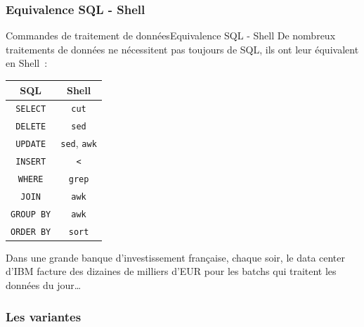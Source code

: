 \documentclass{beamer}
\begin{document}
    \subsubsection{Equivalence SQL - Shell}\label{subsubsec:equi-sql-shell}
    \begin{frame}{Commandes de traitement de données}{Equivalence SQL - Shell}
        De nombreux traitements de données ne nécessitent pas toujours de SQL, ils ont leur équivalent en Shell~:
        \begin{table}[ht]
            \centering
            \begin{tabular}{|c|c|}
                \hline
                \textbf{SQL}         & \textbf{Shell}                   \\
                \hline
                \lstinline{SELECT}   & \lstinline{cut}                  \\
                \hline
                \lstinline{DELETE}   & \lstinline{sed}                  \\
                \hline
                \lstinline{UPDATE}   & \lstinline{sed}, \lstinline{awk} \\
                \hline
                \lstinline{INSERT}   & \lstinline{<}                    \\
                \hline
                \lstinline{WHERE}    & \lstinline{grep}                 \\
                \hline
                \lstinline{JOIN}     & \lstinline{awk}                  \\
                \hline
                \lstinline{GROUP BY} & \lstinline{awk}                  \\
                \hline
                \lstinline{ORDER BY} & \lstinline{sort}                 \\
                \hline
            \end{tabular}
        \end{table}
        Dans une grande banque d'investissement française, chaque soir, le data center d'IBM facture des dizaines de milliers d'EUR pour les batchs qui traitent les données du jour\ldots
    \end{frame}

    \subsubsection{Les variantes}\label{subsubsec:variantes}
\end{document}

